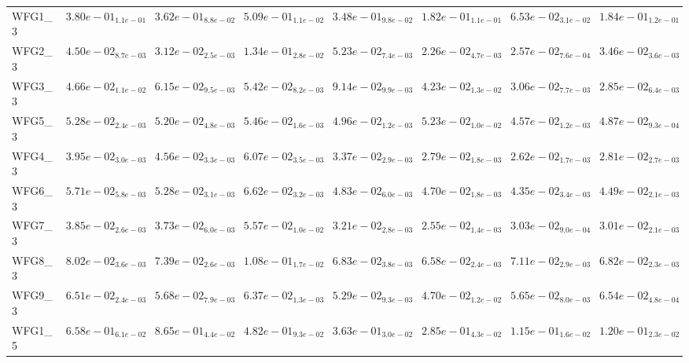 \documentclass{article}
\begin{document}
\begin{table}
\begin{scriptsize}
\begin{tabular}{llllllll}
WFG1\_3 & $  3.80e-01_{ 1.1e-01}$ & $  3.62e-01_{ 8.8e-02}$ & $  5.09e-01_{ 1.1e-02}$ & $  3.48e-01_{ 9.8e-02}$ & \cellcolor{gray25}$  1.82e-01_{ 1.1e-01}$ & \cellcolor{gray95}$  6.53e-02_{ 3.1e-02}$ & $  1.84e-01_{ 1.2e-01}$ \\
WFG2\_3 & $  4.50e-02_{ 8.7e-03}$ & $  3.12e-02_{ 2.5e-03}$ & $  1.34e-01_{ 2.8e-02}$ & $  5.23e-02_{ 7.4e-03}$ & \cellcolor{gray95}$  2.26e-02_{ 4.7e-03}$ & \cellcolor{gray25}$  2.57e-02_{ 7.6e-04}$ & $  3.46e-02_{ 3.6e-03}$ \\
WFG3\_3 & $  4.66e-02_{ 1.1e-02}$ & $  6.15e-02_{ 9.5e-03}$ & $  5.42e-02_{ 8.2e-03}$ & $  9.14e-02_{ 9.9e-03}$ & $  4.23e-02_{ 1.3e-02}$ & \cellcolor{gray25}$  3.06e-02_{ 7.7e-03}$ & \cellcolor{gray95}$  2.85e-02_{ 6.4e-03}$ \\
WFG5\_3 & $  5.28e-02_{ 2.4e-03}$ & $  5.20e-02_{ 4.8e-03}$ & $  5.46e-02_{ 1.6e-03}$ & $  4.96e-02_{ 1.2e-03}$ & $  5.23e-02_{ 1.0e-02}$ & \cellcolor{gray95}$  4.57e-02_{ 1.2e-03}$ & \cellcolor{gray25}$  4.87e-02_{ 9.3e-04}$ \\
WFG4\_3 & $  3.95e-02_{ 3.0e-03}$ & $  4.56e-02_{ 3.3e-03}$ & $  6.07e-02_{ 3.5e-03}$ & $  3.37e-02_{ 2.9e-03}$ & \cellcolor{gray25}$  2.79e-02_{ 1.8e-03}$ & \cellcolor{gray95}$  2.62e-02_{ 1.7e-03}$ & $  2.81e-02_{ 2.7e-03}$ \\
WFG6\_3 & $  5.71e-02_{ 5.8e-03}$ & $  5.28e-02_{ 3.1e-03}$ & $  6.62e-02_{ 3.2e-03}$ & $  4.83e-02_{ 6.0e-03}$ & $  4.70e-02_{ 1.8e-03}$ & \cellcolor{gray95}$  4.35e-02_{ 3.4e-03}$ & \cellcolor{gray25}$  4.49e-02_{ 2.1e-03}$ \\
WFG7\_3 & $  3.85e-02_{ 2.6e-03}$ & $  3.73e-02_{ 6.0e-03}$ & $  5.57e-02_{ 1.0e-02}$ & $  3.21e-02_{ 2.8e-03}$ & \cellcolor{gray95}$  2.55e-02_{ 1.4e-03}$ & $  3.03e-02_{ 9.0e-04}$ & \cellcolor{gray25}$  3.01e-02_{ 2.1e-03}$ \\
WFG8\_3 & $  8.02e-02_{ 3.6e-03}$ & $  7.39e-02_{ 2.6e-03}$ & $  1.08e-01_{ 1.7e-02}$ & $  6.83e-02_{ 3.8e-03}$ & \cellcolor{gray95}$  6.58e-02_{ 2.4e-03}$ & $  7.11e-02_{ 2.9e-03}$ & \cellcolor{gray25}$  6.82e-02_{ 2.3e-03}$ \\
WFG9\_3 & $  6.51e-02_{ 2.4e-03}$ & $  5.68e-02_{ 7.9e-03}$ & $  6.37e-02_{ 1.3e-03}$ & \cellcolor{gray25}$  5.29e-02_{ 9.3e-03}$ & \cellcolor{gray95}$  4.70e-02_{ 1.2e-02}$ & $  5.65e-02_{ 8.0e-03}$ & $  6.54e-02_{ 4.8e-04}$ \\
WFG1\_5 & $  6.58e-01_{ 6.1e-02}$ & $  8.65e-01_{ 4.4e-02}$ & $  4.82e-01_{ 9.3e-02}$ & $  3.63e-01_{ 3.0e-02}$ & $  2.85e-01_{ 4.3e-02}$ & \cellcolor{gray95}$  1.15e-01_{ 1.6e-02}$ & \cellcolor{gray25}$  1.20e-01_{ 2.3e-02}$ \\

\end{tabular}
\end{scriptsize}
\end{table}
\end{document}
